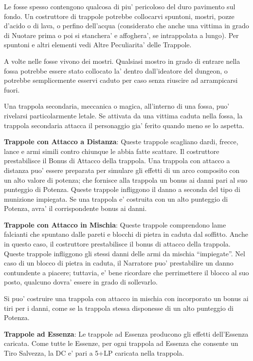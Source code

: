 \documentclass[a4paper,11pt,twoside,openany]{dndbook}
\begin{document}
Le fosse spesso contengono qualcosa di piu' pericoloso del duro pavimento sul fondo. Un costruttore di trappole potrebbe collocarvi spuntoni, mostri, pozze d'acido o di lava, o perfino dell'acqua (considerato che anche una vittima in grado di Nuotare prima o poi si stanchera' e affoghera', se intrappolata a lungo). Per spuntoni e altri elementi vedi Altre Peculiarita' delle Trappole.

A volte nelle fosse vivono dei mostri. Qualsiasi mostro in grado di entrare nella fossa potrebbe essere stato collocato la' dentro dall'ideatore del dungeon, o potrebbe semplicemente esservi caduto per caso senza riuscire ad arrampicarsi fuori.

Una trappola secondaria, meccanica o magica, all'interno di una fossa, puo' rivelarsi particolarmente letale. Se attivata da una vittima caduta nella fossa, la trappola secondaria attacca il personaggio gia' ferito quando meno se lo aspetta.

\textbf{Trappole con Attacco a Distanza}: Queste trappole scagliano dardi, frecce, lance e armi simili contro chiunque le abbia fatte scattare. Il costruttore prestabilisce il Bonus di Attacco della trappola. Una trappola con attacco a distanza puo' essere preparata per simulare gli effetti di un arco composito con un alto valore di potenza; che fornisce alla trappola un bonus ai danni pari al suo punteggio di Potenza. Queste trappole infliggono il danno a seconda del tipo di munizione impiegata. Se una trappola e' costruita con un alto punteggio di Potenza, avra' il corrispondente bonus ai danni.

\textbf{Trappole con Attacco in Mischia}: Queste trappole comprendono lame falcianti che spuntano dalle pareti e blocchi di pietra in caduta dal soffitto. Anche in questo caso, il costruttore prestabilisce il bonus di attacco della trappola. Queste trappole infliggono gli stessi danni delle armi da mischia ``impiegate''. Nel caso di un blocco di pietra in caduta, il Narratore puo' prestabilire un danno contundente a piacere; tuttavia, e' bene ricordare che perrimettere il blocco al suo posto, qualcuno dovra' essere in grado di sollevarlo.

Si puo' costruire una trappola con attacco in mischia con incorporato un bonus ai tiri per i danni, come se la trappola stessa disponesse di un alto punteggio di Potenza.

\textbf{Trappole ad Essenza}: Le trappole ad Essenza producono gli effetti dell'Essenza caricata. Come tutte le Essenze, per ogni trappola ad Essenza che consente un Tiro Salvezza, la DC e' pari a 5+LP caricata nella trappola.
\end{document}
